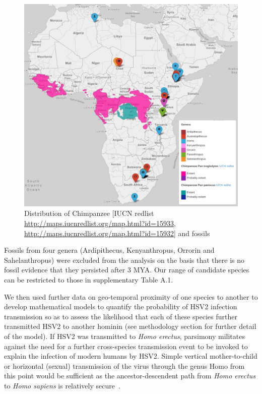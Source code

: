 \documentclass[fleqn,10pt]{wlscirep}
\begin{document}
\begin{figure}
  \centering
  \includegraphics[width=\textwidth]{figs/chimpanzee}
  \caption{Distribution of Chimpanzee [IUCN redlist \url{http://maps.iucnredlist.org/map.html?id=15933}, \url{http://maps.iucnredlist.org/map.html?id=15932}] and fossils}
  \label{fig:chimpanzee}   
\end{figure}     

Fossils from four genera (Ardipithecus, Kenyanthropus, Orrorin and Sahelanthropus) were excluded from the analysis on the basis that there is no fossil evidence that they persisted after 3 MYA. Our range of candidate species can be restricted to those in supplementary Table A.1.

We then used further data on geo-temporal proximity of one species to another to develop mathematical models to quantify the probability of HSV2 infection transmission so as to assess the likelihood that each of these species further transmitted HSV2 to another hominin (see methodology section for further detail of the model). If HSV2 was transmitted to \textit{Homo erectus}, parsimony militates against the need for a further cross-species transmission event to be invoked to explain the infection of modern humans by HSV2. Simple vertical mother-to-child or horizontal (sexual) transmission of the virus through the genus Homo from this point would be sufficient as the ancestor-descendent path from \textit{Homo erectus} to \textit{Homo sapiens} is relatively secure~\cite{Maslin2015}.
\end{document}
